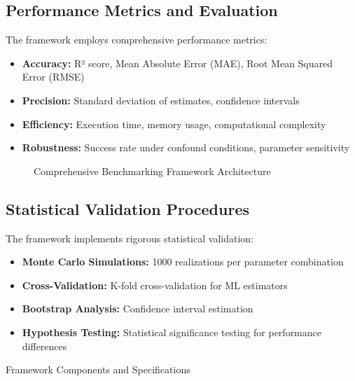 \subsection{Performance Metrics and Evaluation}

The framework employs comprehensive performance metrics:

\begin{itemize}
    \item \textbf{Accuracy:} R² score, Mean Absolute Error (MAE), Root Mean Squared Error (RMSE)
    \item \textbf{Precision:} Standard deviation of estimates, confidence intervals
    \item \textbf{Efficiency:} Execution time, memory usage, computational complexity
    \item \textbf{Robustness:} Success rate under confound conditions, parameter sensitivity
\end{itemize}

\begin{figure}[h]
\centering
\caption{Comprehensive Benchmarking Framework Architecture}
\label{fig:framework_architecture}
\end{figure}

\subsection{Statistical Validation Procedures}

The framework implements rigorous statistical validation:

\begin{itemize}
    \item \textbf{Monte Carlo Simulations:} 1000 realizations per parameter combination
    \item \textbf{Cross-Validation:} K-fold cross-validation for ML estimators
    \item \textbf{Bootstrap Analysis:} Confidence interval estimation
    \item \textbf{Hypothesis Testing:} Statistical significance testing for performance differences
\end{itemize}

\begin{table}[h]
\centering
\caption{Framework Components and Specifications}
\label{tab:framework_components}
\end{table}
